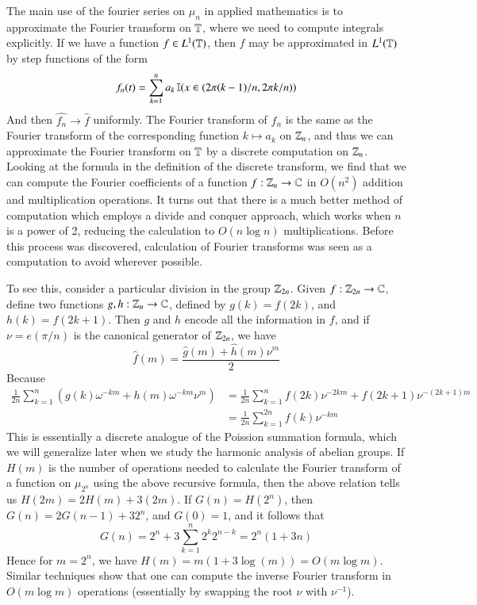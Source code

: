 The main use of the fourier series on $\mu_n$ in applied mathematics is to approximate the Fourier transform on $\operatorname{\mathbb{T}}$, where we need to compute integrals explicitly. If we have a function $f \in L^1(\operatorname{\mathbb{T}})$, then $f$ may be approximated in $L^1(\operatorname{\mathbb{T}})$ by step functions of the form
%
\[ f_n(t) = \sum_{k = 1}^{n} a_k \operatorname{\mathbb{I}}(x \in (2 \pi (k-1) / n, 2 \pi k / n)) \]
%
And then $\widehat{f_n} \to \widehat{f}$ uniformly. The Fourier transform of $f_n$ is the same as the Fourier transform of the corresponding function $k \mapsto a_k$ on $\operatorname{\mathbb{Z}}_n$, and thus we can approximate the Fourier transform on $\operatorname{\mathbb{T}}$ by a discrete computation on $\operatorname{\mathbb{Z}}_n$. Looking at the formula in the definition of the discrete transform, we find that we can compute the Fourier coefficients of a function $f: \operatorname{\mathbb{Z}}_n \to \operatorname{\mathbb{C}}$ in $O(n^2)$ addition and multiplication operations. It turns out that there is a much better method of computation which employs a divide and conquer approach, which works when $n$ is a power of 2, reducing the calculation to $O(n \log n)$ multiplications. Before this process was discovered, calculation of Fourier transforms was seen as a computation to avoid wherever possible.

To see this, consider a particular division in the group $\operatorname{\mathbb{Z}}_{2n}$. Given $f: \operatorname{\mathbb{Z}}_{2n} \to \operatorname{\mathbb{C}}$, define two functions $g,h: \operatorname{\mathbb{Z}}_n \to \operatorname{\mathbb{C}}$, defined by $g(k) = f(2k)$, and $h(k) = f(2k + 1)$. Then $g$ and $h$ encode all the information in $f$, and if $\nu = e(\pi/n)$ is the canonical generator of $\operatorname{\mathbb{Z}}_{2n}$, we have
%
\[ \hat{f}(m) = \frac{\hat{g}(m) + \hat{h}(m) \nu^m}{2} \]
%
Because
%
\begin{align*}
    \frac{1}{2n} \sum_{k = 1}^{n} \left( g(k) \omega^{-km} + h(m) \omega^{-km} \nu^m \right) &= \frac{1}{2n} \sum_{k = 1}^n f(2k) \nu^{-2km} + f(2k + 1) \nu^{-(2k+1)m}\\
    &= \frac{1}{2n} \sum_{k = 1}^{2n} f(k) \nu^{-km}
\end{align*}
%
This is essentially a discrete analogue of the Poission summation formula, which we will generalize later when we study the harmonic analysis of abelian groups. If $H(m)$ is the number of operations needed to calculate the Fourier transform of a function on $\mu_{2^n}$ using the above recursive formula, then the above relation tells us $H(2m) = 2H(m) + 3 (2m)$. If $G(n) = H(2^n)$, then $G(n) = 2G(n-1) + 3 2^n$, and $G(0) = 1$, and it follows that
%
\[ G(n) = 2^n + 3 \sum_{k = 1}^n 2^{k} 2^{n-k} = 2^n(1 + 3n) \]
%
Hence for $m = 2^n$, we have $H(m) = m(1 + 3 \log (m)) = O(m \log m)$. Similar techniques show that one can compute the inverse Fourier transform in $O(m \log m)$ operations (essentially by swapping the root $\nu$ with $\nu^{-1}$).

